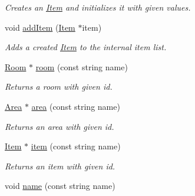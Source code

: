 \begin{DoxyCompactItemize}
\begin{DoxyCompactList}\small\item\em Creates an \hyperlink{classItem}{Item} and initializes it with given values. \item\end{DoxyCompactList}\item 
\hypertarget{classRoomsManager_aba9a17973e250faa43453c5e2c7dd9cb}{
void \hyperlink{classRoomsManager_aba9a17973e250faa43453c5e2c7dd9cb}{addItem} (\hyperlink{classItem}{Item} $\ast$item)}
\label{classRoomsManager_aba9a17973e250faa43453c5e2c7dd9cb}

\begin{DoxyCompactList}\small\item\em Adds a created \hyperlink{classItem}{Item} to the internal item list. \item\end{DoxyCompactList}\item 
\hypertarget{classRoomsManager_a2b5576d4b35766cc73cdccc43b905a08}{
\hyperlink{classRoom}{Room} $\ast$ \hyperlink{classRoomsManager_a2b5576d4b35766cc73cdccc43b905a08}{room} (const string name)}
\label{classRoomsManager_a2b5576d4b35766cc73cdccc43b905a08}

\begin{DoxyCompactList}\small\item\em Returns a room with given id. \item\end{DoxyCompactList}\item 
\hypertarget{classRoomsManager_a34bccc09a45e0f8206b25c5a5825acb1}{
\hyperlink{classArea}{Area} $\ast$ \hyperlink{classRoomsManager_a34bccc09a45e0f8206b25c5a5825acb1}{area} (const string name)}
\label{classRoomsManager_a34bccc09a45e0f8206b25c5a5825acb1}

\begin{DoxyCompactList}\small\item\em Returns an area with given id. \item\end{DoxyCompactList}\item 
\hypertarget{classRoomsManager_a2cf3744ae9e3873c21b711a996cfe562}{
\hyperlink{classItem}{Item} $\ast$ \hyperlink{classRoomsManager_a2cf3744ae9e3873c21b711a996cfe562}{item} (const string name)}
\label{classRoomsManager_a2cf3744ae9e3873c21b711a996cfe562}

\begin{DoxyCompactList}\small\item\em Returns an item with given id. \item\end{DoxyCompactList}\item 
\hypertarget{classRoomsManager_ae96cd535e95787c60c1a002a60c1ffb3}{
void \hyperlink{classRoomsManager_ae96cd535e95787c60c1a002a60c1ffb3}{name} (const string name)}
\label{classRoomsManager_ae96cd535e95787c60c1a002a60c1ffb3}


\end{DoxyCompactItemize}

